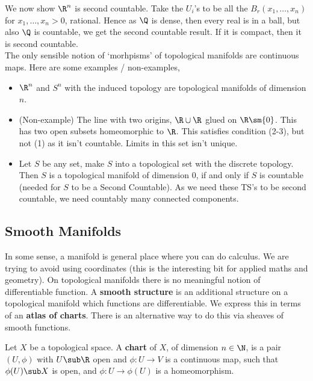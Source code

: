  \noindent
 We now show $\R^n$ is second countable. Take the $U_i$'s to be all the $B_r(x_1, \dots, x_n)$ for $x_1, \dots, x_n > 0$, rational. Hence as $\Q$ is dense, then every real is in a ball, but also $\Q$ is countable, we get the second countable result. If it is compact, then it is second countable.\\

 \noindent
 The only sensible notion of `morhpisms' of topological manifolds are continuous maps. Here are some examples / non-examples,
 \begin{eg}
   \begin{itemize}
     \item $\R^n$ and $S^n$ with the induced topology are topological manifolds of dimension $n$.
     \item (Non-example) The line with two origins, $\R \cup \R$ glued on $\R \sm \{0\}$. This has two open subsets homeomorphic to $\R$. This satisfies condition (2-3), but not (1) as it isn't countable. Limits in this set isn't unique.
     \item Let $S$ be any set, make $S$ into a topological set with the discrete topology. Then $S$ is a topological manifold of dimension $0$, if and only if $S$ is countable (needed for $S$ to be a Second Countable). As we need these TS's to be second countable, we need countably many connected components.
   \end{itemize}
 \end{eg}

 \subsection{Smooth Manifolds}
In some sense, a manifold is general place where you can do calculus. We are trying to avoid using coordinates (this is the interesting bit for applied maths and geometry). On topological manifolds there is no meaningful notion of differentiable function. A \textbf{smooth structure} is an additional structure on a topological manifold which functions are differentiable. We express this in terms of an \textbf{atlas of charts}. There is an alternative way to do this via sheaves of smooth functions.

\begin{ndefi}[Chart]
  Let $X$ be a topological space. A \textbf{chart} of $X$, of dimension $n \in \N$, is a pair $(U, \phi)$ with $U \sub \R$ open and $\phi : U \to V$ is a continuous map, such that $\phi(U) \sub X$ is open, and $\phi : U \to \phi(U)$ is a homeomorphism.
\end{ndefi}

